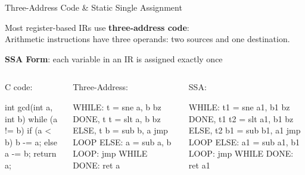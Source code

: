\documentclass{plt}
\begin{document}

\begin{frame}[fragile]{Three-Address Code \& Static Single Assignment}
  
  Most register-based IRs use \textbf{three-address code}: \\ Arithmetic
  instructions have three operands: two sources and one destination.

  \textbf{SSA Form}: each variable in an IR is assigned exactly once

\vspace{10pt}

\begin{columns}[t]
  \begin{column}[t]{0.33\textwidth}   
\center C code:
\vspace{0.5pc}

\begin{C}
int gcd(int a, int b)
{
  while (a != b)
    if (a < b)
      b -= a;
    else
      a -= b;
  return a;
}
\end{C}
  \end{column}%
  \begin{column}[t]{0.3\textwidth}
\center Three-Address:
\vspace{0.5pc}


\begin{llvm}
WHILE:   t = sne a, b
         bz DONE, t
         t = slt a, b
         bz ELSE, t
         b = sub b, a
         jmp LOOP
ELSE:    a = sub a, b
LOOP:    jmp WHILE
DONE:    ret a
\end{llvm}
  \end{column}%
  \begin{column}[t]{0.33\textwidth}
\center SSA:
\vspace{0.5pc}

\begin{llvm}
WHILE:   t1 = sne a1, b1
         bz DONE, t1
         t2 = slt a1, b1
         bz ELSE, t2
         b1 = sub b1, a1
         jmp LOOP
ELSE:    a1 = sub a1, b1
LOOP:    jmp WHILE
DONE:    ret a1
\end{llvm}
  \end{column}
\end{columns}

\end{frame}
\end{document}
